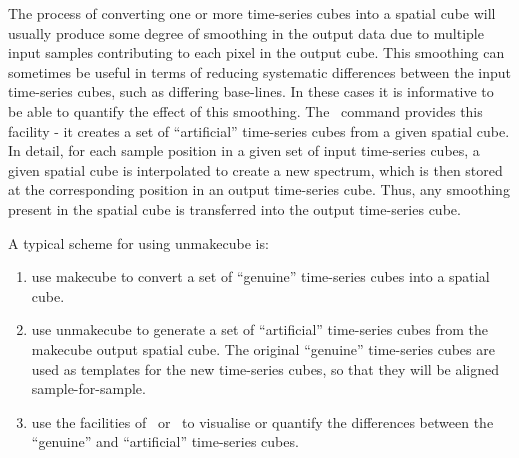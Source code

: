 \documentclass[oneside,11pt]{starlink}
\begin{document}
The process of converting one or more time-series cubes into a spatial
cube will usually produce some degree of smoothing in the output data due
to multiple input samples contributing to each pixel in the output cube.
This smoothing can sometimes be useful in terms of reducing systematic
differences between the input time-series cubes, such as differing
base-lines. In these cases it is informative to be able to quantify the
effect of this smoothing. The \unmakecube\ command provides this facility
- it creates a set of ``artificial'' time-series cubes from a given
spatial cube. In detail, for each sample position in a given set of input
time-series cubes, a given spatial cube is interpolated to create a new
spectrum, which is then stored at the corresponding position in an output
time-series cube. Thus, any smoothing present in the spatial cube is
transferred into the output time-series cube.

A typical scheme for using unmakecube is:

\begin{enumerate}
\item use makecube to convert a set of ``genuine'' time-series cubes into
a spatial cube.
\item use unmakecube to generate a set of ``artificial'' time-series cubes
from the makecube output spatial cube. The original ``genuine''
time-series cubes are used as templates for the new time-series cubes, so
that they will be aligned sample-for-sample.
\item use the facilities of \KAPPA\ or \GAIA\ to visualise or quantify the
differences between the ``genuine'' and ``artificial'' time-series cubes.
\end{enumerate}
\end{document}
